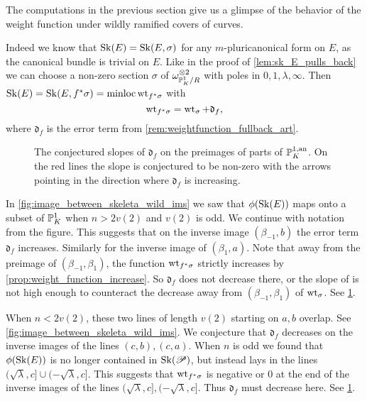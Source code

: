 The computations in the previous section give us a glimpse of the behavior of the weight function under wildly ramified covers of curves. 

Indeed we know that $\operatorname{Sk}(E) = \operatorname{Sk}(E, \sigma)$ for any $m$-pluricanonical form on $E$, as the canonical bundle is trivial on $E$. 
Like in the proof of \cref{lem:sk_E_pulls_back} we can choose a non-zero section $\sigma$ of $\omega_{\mathbb{P}^{1}_K  / R} ^{\otimes 2}$ with poles in $0, 1, \lambda, \infty$. 
Then $\operatorname{Sk}(E) = \operatorname{Sk}(E, f^*\sigma) = \operatorname{minloc} \operatorname{wt}_{f^* \sigma}$ with \[
\operatorname{wt}_{f^*\sigma} = \operatorname{wt}_{\sigma} + \mathfrak{d}_f
,\] 
where $\mathfrak{d}_f $ is the error term from \cref{rem:weightfunction_fullback_art}. 

\begin{figure}[ht]
    \centering
    \caption{The conjectured slopes of $\mathfrak{d} _f$ on the preimages of parts of $\mathbb{P}^{1, \text{an}}_K$.
    On the red lines the slope is conjectured to be non-zero with the arrows pointing in the direction where $\mathfrak{d}_f $ is increasing. }
    \label{fig:slope_log_different}
\end{figure}

In \cref{fig:image_between_skeleta_wild_ims} we saw that $\phi(\sk(E))$ maps onto a subset of  $\mathbb{P}^{1}_K$ when $n > 2v(2)$ and $v(2)$ is odd. We continue with notation from the figure.
This suggests that on the inverse image $(\beta_{-1}, b)$ the error term $\mathfrak{d}_f $ increases. 
Similarly for the inverse image of  $(\beta_1, a)$. 
Note that away from the preimage of $(\beta_{-1}, \beta_1)$, the function $\operatorname{wt}_{f^*\sigma}$ strictly increases by \cref{prop:weight_function_increase}.
So $\mathfrak{d} _f$ does not decrease there, or the slope of is not high enough to counteract the decrease away from $(\beta_{-1}, \beta_1)$ of $\operatorname{wt}_{\sigma}$. 
See \cref{fig:slope_log_different}.

When $n < 2v(2)$, these two lines of length $v(2)$ starting on $a, b$ overlap. See \cref{fig:image_between_skeleta_wild_ims}. 
We conjecture that $\mathfrak{d} _f$ decreases on the inverse images of the lines $(c, b), (c, a)$. 
When $n$ is odd we found that $\phi(\sk(E))$ is no longer contained in $\operatorname{Sk}(\mathscr P)$, but instead lays in the lines $(\sqrt{\lambda}, c]\cup (-\sqrt{\lambda} , c]  $. 
This suggests that $\operatorname{wt}_{f^*\sigma}$ is negative or 0 at the end of the inverse images of the lines $(\sqrt{\lambda}, c], (-\sqrt{\lambda}, c]$. 
Thus $\mathfrak{d} _f$ must decrease here. 
See \cref{fig:slope_log_different}.



 
